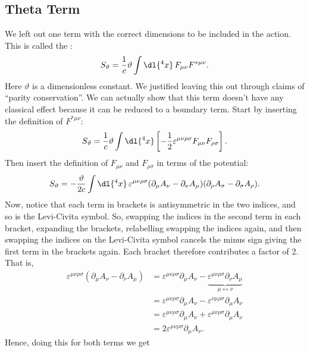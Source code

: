 \subsection{Theta Term}
We left out one term with the correct dimensions to be included in the action.
This is called the :
\begin{equation}
    S_{\vartheta} = \frac{1}{c} \vartheta \int\dl{^4x} \, F_{\mu\nu} F^{*\mu\nu}.
\end{equation}
Here \(\vartheta\) is a dimensionless constant.
We justified leaving this out through claims of \enquote{parity conservation}.
We can actually show that this term doesn't have any classical effect because it can be reduced to a boundary term.
Start by inserting the definition of \(F^{*\mu\nu}\):
\begin{equation}
    S_{\vartheta} = \frac{1}{c}\vartheta \int \dl{^4x} \left[ -\frac{1}{2} \varepsilon^{\mu\nu\rho\sigma} F_{\mu\nu}F_{\rho\sigma} \right].
\end{equation}
Then insert the definition of \(F_{\mu\nu}\) and \(F_{\rho\sigma}\) in terms of the potential:
\begin{equation}
    S_{\vartheta} = -\frac{\vartheta}{2c} \int \dl{^4x}  \, \varepsilon^{\mu\nu\rho\sigma}(\partial_\mu A_\nu - \partial_\nu A_\mu)(\partial_\rho A_\sigma - \partial_\sigma A_\rho).
\end{equation}
Now, notice that each term in brackets is antisymmetric in the two indices, and so is the Levi-Civita symbol.
So, swapping the indices in the second term in each bracket, expanding the brackets, relabelling swapping the indices again, and then swapping the indices on the Levi-Civita symbol cancels the minus sign giving the first term in the brackets again.
Each bracket therefore contributes a factor of 2.
That is,
\begin{align}
    \varepsilon^{\mu\nu\rho\sigma} (\partial_\mu A_\nu - \partial_\nu A_\mu) &= \varepsilon^{\mu\nu\rho\sigma}\partial_\mu A_\nu - \underbrace{\varepsilon^{\mu\nu\rho\sigma} \partial_\nu A_\mu}_{\mu \leftrightarrow \nu}\\
    &= \varepsilon^{\mu\nu\rho\sigma}\partial_\mu A_\nu - \varepsilon^{\nu\mu\rho\sigma}\partial_\mu A_\nu\\
    &= \varepsilon^{\mu\nu\rho\sigma}\partial_\mu A_\nu + \varepsilon^{\mu\nu\rho\sigma}\partial_\mu A_\nu\\
    &= 2\varepsilon^{\mu\nu\rho\sigma}\partial_\mu A_\nu.
\end{align}
Hence, doing this for both terms we get
